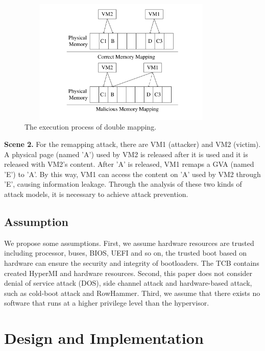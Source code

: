\documentclass[conference]{IEEEtran}
\begin{document}
\begin{figure}
\centerline{\includegraphics[width=10cm, height=6cm]{pdfvmcs.pdf}}%
\caption{The execution process of double mapping. } \label{fig0}
\end{figure}

\textbf{Scene 2.}
    For the remapping attack, there are VM1 (attacker) and VM2 (victim). A physical page (named 'A') used by VM2 is released after it is used and it is released with VM2's content. After 'A' is released, VM1 remaps a GVA (named 'E') to 'A'. By this way, VM1 can access the content on 'A' used by VM2 through 'E', causing information leakage.
Through the analysis of these two kinds of attack models, it is necessary to achieve attack prevention.
\subsection{Assumption}

We propose some assumptions.
First, we assume hardware resources are trusted including processor, buses, BIOS, UEFI and so on, the trusted boot based on hardware can ensure the security and integrity of bootloaders. The TCB contains created HyperMI and hardware resources. Second, this paper does not consider denial of service attack (DOS), side channel attack and hardware-based attack, such as cold-boot attack and RowHammer. Third, we assume that there exists no software that runs at a higher privilege level than the hypervisor.


\section{Design and Implementation}\label{sec:design}
\end{document}
